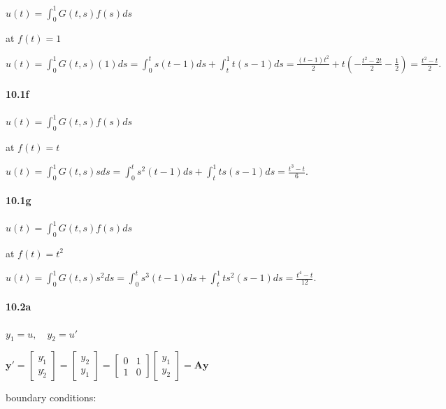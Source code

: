 \documentclass[a4paper, 11pt]{article}
\begin{document}
	$u(t)=\int_{0}^{1}G(t,s)f(s)ds$
	
	at $f(t)=1$
	
	$u(t)=\int_{0}^{1}G(t,s)(1)ds=\int_{0}^{t}s(t-1)ds+\int_{t}^{1}t(s-1)ds=\frac{(t-1)t^{2}}{2}+t\left(-\frac{t^{2}-2t}{2}-\frac{1}{2}\right)=\frac{t^{2}-t}{2}.$
	
	
	\paragraph{10.1f}
	
	$u(t)=\int_{0}^{1}G(t,s)f(s)ds$
	
	at $f(t)=t$
	
	$u(t)=\int_{0}^{1}G(t,s)sds=\int_{0}^{t}s^{2}(t-1)ds+\int_{t}^{1}ts(s-1)ds=\frac{t^{3}-t}{6}.$
	
	
	\paragraph{10.1g}
	
	$u(t)=\int_{0}^{1}G(t,s)f(s)ds$
	
	at $f(t)=t^{2}$
	
	$u(t)=\int_{0}^{1}G(t,s)s^{2}ds=\int_{0}^{t}s^{3}(t-1)ds+\int_{t}^{1}ts^{2}(s-1)ds=\frac{t^{4}-t}{12}.$
	
	
	\paragraph{10.2a}
	
	$y_{1}=u,\quad y_{2}=u'$
	
	$\mathbf{y}'=\left[\begin{array}{c}
	y_{1}^{,}\\
	y_{2}^{,}
	\end{array}\right]=\left[\begin{array}{c}
	y_{2}\\
	y_{1}
	\end{array}\right]=\left[\begin{array}{cc}
	0 & 1\\
	1 & 0
	\end{array}\right]\left[\begin{array}{c}
	y_{1}\\
	y_{2}
	\end{array}\right]=\mathbf{Ay}$
	
	boundary conditions:
	
\end{document}
